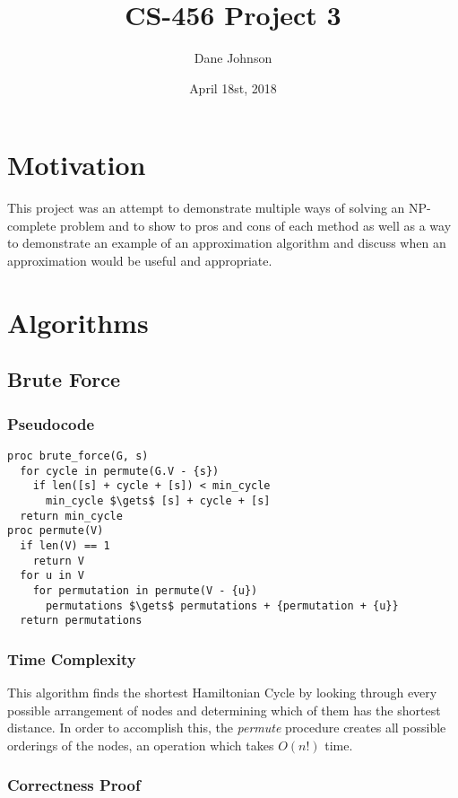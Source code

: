 \documentclass[a4paper,12pt]{article}
\title{CS-456 Project 3}
\author{Dane Johnson}
\date{April 18st, 2018}
\begin{document}
\maketitle
\newpage
\section{Motivation}

This project was an attempt to demonstrate multiple ways of solving an NP-complete problem and to show to pros and cons
of each method as well as a way to demonstrate an example of an approximation algorithm and discuss when an approximation
would be useful and appropriate.

\section{Algorithms}
\subsection{Brute Force}
\subsubsection{Pseudocode}
\begin{lstlisting}[mathescape=true]
proc brute_force(G, s)
  for cycle in permute(G.V - {s})
    if len([s] + cycle + [s]) < min_cycle
      min_cycle $\gets$ [s] + cycle + [s]
  return min_cycle
proc permute(V)
  if len(V) == 1
    return V
  for u in V
    for permutation in permute(V - {u})
      permutations $\gets$ permutations + {permutation + {u}}
  return permutations
\end{lstlisting}
\subsubsection{Time Complexity}
This algorithm finds the shortest Hamiltonian Cycle by looking through every possible arrangement of nodes and determining which of them has the shortest distance. In order to accomplish this, the {\it permute} procedure creates all possible orderings of the nodes, an operation which takes $O(n!)$ time.
\subsubsection{Correctness Proof}
\end{document}
